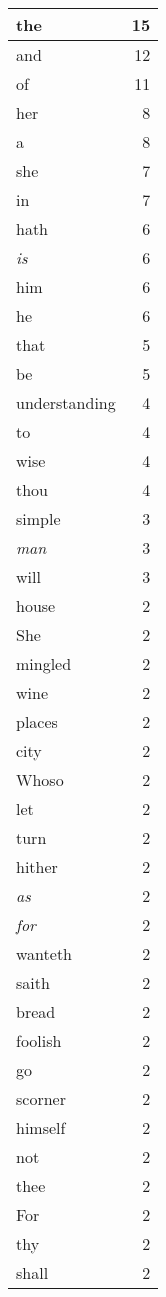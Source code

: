 \begin{center}
\begin{longtable}{l|r}
the & 15\\ \hline 
and & 12\\ \hline 
of & 11\\ \hline 
her & 8\\ \hline 
a & 8\\ \hline 
she & 7\\ \hline 
in & 7\\ \hline 
hath & 6\\ \hline 
\emph{is} & 6\\ \hline 
him & 6\\ \hline 
he & 6\\ \hline 
that & 5\\ \hline 
be & 5\\ \hline 
understanding & 4\\ \hline 
to & 4\\ \hline 
wise & 4\\ \hline 
thou & 4\\ \hline 
simple & 3\\ \hline 
\emph{man} & 3\\ \hline 
will & 3\\ \hline 
house & 2\\ \hline 
She & 2\\ \hline 
mingled & 2\\ \hline 
wine & 2\\ \hline 
places & 2\\ \hline 
city & 2\\ \hline 
Whoso & 2\\ \hline 
let & 2\\ \hline 
turn & 2\\ \hline 
hither & 2\\ \hline 
\emph{as} & 2\\ \hline 
\emph{for} & 2\\ \hline 
wanteth & 2\\ \hline 
saith & 2\\ \hline 
bread & 2\\ \hline 
foolish & 2\\ \hline 
go & 2\\ \hline 
scorner & 2\\ \hline 
himself & 2\\ \hline 
not & 2\\ \hline 
thee & 2\\ \hline 
For & 2\\ \hline 
thy & 2\\ \hline 
shall & 2\\ \hline 

\end{longtable}
\end{center}

